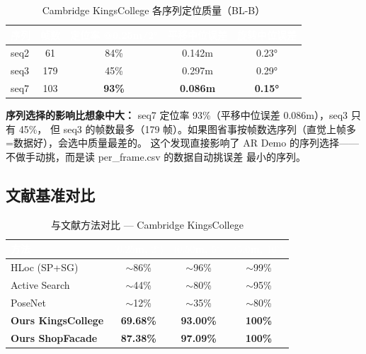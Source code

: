 \documentclass[12pt,a4paper]{ctexart}
\newcommand{\bestval}[1]{\textcolor{best}{\textbf{#1}}}
\begin{document}
\begin{table}[H]
\centering
\caption{Cambridge KingsCollege 各序列定位质量（BL-B）}
\label{tab:seq_quality}
\begin{tabular}{@{}lcccc@{}}
\toprule
\rowcolor{headbg}
\textcolor{white}{\textbf{序列}} &
\textcolor{white}{\textbf{帧数}} &
\textcolor{white}{\textbf{定位率 @0.25m/2°}} &
\textcolor{white}{\textbf{平移中位误差}} &
\textcolor{white}{\textbf{旋转中位误差}} \\
\midrule
seq2 & 61  & 84\% & 0.142m & 0.23° \\
seq3 & 179 & \textcolor{warn}{45\%} & \textcolor{warn}{0.297m} & 0.29° \\
seq7 & 103 & \bestval{93\%} & \bestval{0.086m} & \bestval{0.15°} \\
\bottomrule
\end{tabular}
\end{table}

\begin{keyfinding}
\textbf{序列选择的影响比想象中大：} seq7 定位率 93\%（平移中位误差 0.086m），seq3 只有 45\%，
但 seq3 的帧数最多（179 帧）。如果图省事按帧数选序列（直觉上帧多=数据好），会选中质量最差的。
这个发现直接影响了 AR Demo 的序列选择——不做手动挑，而是读 per\_frame.csv 的数据自动挑误差
最小的序列。
\end{keyfinding}

\subsection{文献基准对比}

\begin{table}[H]
\centering
\caption{与文献方法对比 — Cambridge KingsCollege}
\label{tab:lit_cam}
\begin{tabular}{@{}lccc@{}}
\toprule
\rowcolor{headbg}
\textcolor{white}{\textbf{方法}} &
\textcolor{white}{\textbf{$(0.25$m, $2^\circ)$}} &
\textcolor{white}{\textbf{$(0.50$m, $5^\circ)$}} &
\textcolor{white}{\textbf{$(5.0$m, $10^\circ)$}} \\
\midrule
HLoc (SP+SG)      & $\sim$86\% & $\sim$96\% & $\sim$99\% \\
Active Search     & $\sim$44\% & $\sim$80\% & $\sim$95\% \\
PoseNet           & $\sim$12\% & $\sim$35\% & $\sim$80\% \\
\midrule
\textbf{Ours KingsCollege} & \textbf{69.68\%} & \textbf{93.00\%} & \textbf{100\%} \\
\textbf{Ours ShopFacade}   & \textbf{87.38\%} & \textbf{97.09\%} & \textbf{100\%} \\
\bottomrule
\end{tabular}
\end{table}
\end{document}
